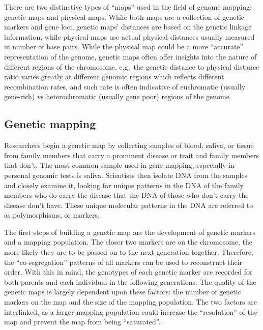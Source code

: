 There are two distinctive types of ``maps'' used in the field of genome mapping: genetic maps and physical maps. While both maps are a collection of genetic markers and gene loci, genetic maps' distances are based on the genetic linkage information, while physical maps use actual physical distances usually measured in number of base pairs. While the physical map could be a more ``accurate'' representation of the genome, genetic maps often offer insights into the nature of different regions of the chromosome, e.g.~the genetic distance to physical distance ratio varies greatly at different genomic regions which reflects different recombination rates, and such rate is often indicative of euchromatic (usually gene-rich) vs heterochromatic (usually gene poor) regions of the genome.

\hypertarget{genetic-mapping}{%
\subsection{Genetic mapping}\label{genetic-mapping}}

Researchers begin a genetic map by collecting samples of blood, saliva, or tissue from family members that carry a prominent disease or trait and family members that don't. The most common sample used in gene mapping, especially in personal genomic tests is saliva. Scientists then isolate DNA from the samples and closely examine it, looking for unique patterns in the DNA of the family members who do carry the disease that the DNA of those who don't carry the disease don't have. These unique molecular patterns in the DNA are referred to as polymorphisms, or markers.

The first steps of building a genetic map are the development of genetic markers and a mapping population. The closer two markers are on the chromosome, the more likely they are to be passed on to the next generation together. Therefore, the ``co-segregation'' patterns of all markers can be used to reconstruct their order. With this in mind, the genotypes of each genetic marker are recorded for both parents and each individual in the following generations. The quality of the genetic maps is largely dependent upon these factors: the number of genetic markers on the map and the size of the mapping population. The two factors are interlinked, as a larger mapping population could increase the ``resolution'' of the map and prevent the map from being ``saturated''.

